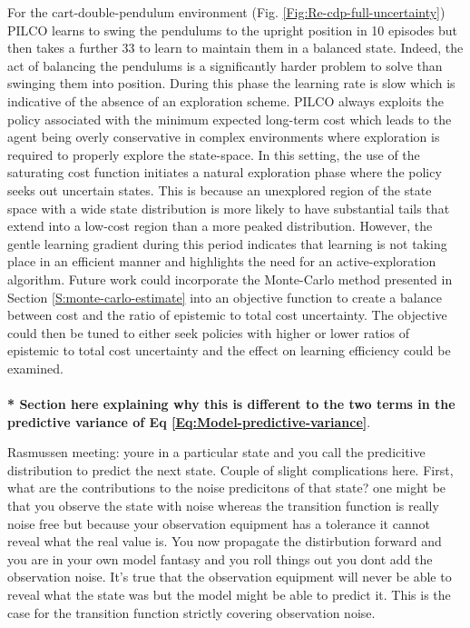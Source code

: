 For the cart-double-pendulum environment (Fig. \ref{Fig:Re-cdp-full-uncertainty}) PILCO learns to swing the pendulums to the upright position in 10 episodes but then takes a further 33 to learn to maintain them in a balanced state. Indeed, the act of balancing the pendulums is a significantly harder problem to solve than swinging them into position. During this phase the learning rate is slow which is indicative of the absence of an exploration scheme. PILCO always exploits the policy associated with the minimum expected long-term cost which leads to the agent being overly conservative in complex environments where exploration is required to properly explore the state-space. In this setting, the use of the saturating cost function initiates a natural exploration phase where the policy seeks out uncertain states. This is because an unexplored region of the state space with a wide state distribution is more likely to have substantial tails that extend into a low-cost region than a more peaked distribution. However, the gentle learning gradient during this period indicates that learning is not taking place in an efficient manner and highlights the need for an active-exploration algorithm. Future work could incorporate the Monte-Carlo method presented in Section \ref{S:monte-carlo-estimate} into an objective function to create a balance between cost and the ratio of epistemic to total cost uncertainty. The objective could then be tuned to either seek policies with higher or lower ratios of epistemic to total cost uncertainty and the effect on learning efficiency could be examined.

\paragraph{}

\textbf{* Section here explaining why this is different to the two terms in the predictive variance of Eq \ref{Eq:Model-predictive-variance}}.


Rasmussen meeting: youre in  a particular state and you call the predicitive distribution to predict the next state. Couple of slight complications here. First, what are the contributions to the noise predicitons of that state? one might be that you observe the state with noise whereas the transition function is really noise free but because your observation equipment has a tolerance it cannot reveal what the real value is. You now propagate the distirbution forward and you are in your own model fantasy and you roll things out you dont add the observation noise. It's true that the observation equipment will never be able to reveal what the state was but the model might be able to predict it. This is the case for the transition function strictly covering observation noise.

